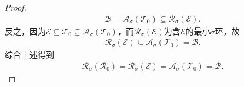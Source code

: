 \documentclass[../../main.tex]{subfiles}%
\begin{document}
\begin{proof}
\begin{align*}
\mathscr{B}=\mathscr{A}_\sigma(\mathscr{T}_0)\subseteq\mathscr{R}_\sigma(\mathscr{E}).
\end{align*}
反之，因为$\mathscr{E}\subseteq\mathscr{T}_0\subseteq\mathscr{A}_\sigma(\mathscr{T}_0)$，而$\mathscr{R}_\sigma(\mathscr{E})$为含$\mathscr{E}$的最小$\sigma$环，故
\begin{align*}
\mathscr{R}_\sigma(\mathscr{E})\subseteq\mathscr{A}_\sigma(\mathscr{T}_0)=\mathscr{B}.
\end{align*}
综合上述得到
\begin{align*}
\mathscr{R}_\sigma(\mathscr{R}_0)=\mathscr{R}_\sigma(\mathscr{E})=\mathscr{A}_\sigma(\mathscr{T}_0)=\mathscr{B}.
\end{align*}
\end{proof}
\end{document}
